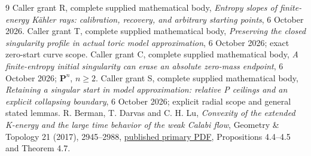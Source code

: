 \documentclass[11pt]{article}
\begin{document}
\begin{thebibliography}{9}
 Caller grant R, complete supplied mathematical body,
\emph{Entropy slopes of finite-energy K\"ahler rays: calibration,
recovery, and arbitrary starting points}, 6 October 2026.
 Caller grant T, complete supplied mathematical body,
\emph{Preserving the closed singularity profile in actual toric
model approximation}, 6 October 2026; exact zero-start curve scope.
 Caller grant C, complete supplied mathematical body,
\emph{A finite-entropy initial singularity can erase an absolute
zero-mass endpoint}, 6 October 2026; $\mathbf P^n$, $n\ge2$.
 Caller grant S, complete supplied mathematical body,
\emph{Retaining a singular start in model approximation:
relative P ceilings and an explicit collapsing boundary},
6 October 2026; explicit radial scope and general stated lemmas.
 R. Berman, T. Darvas and C. H. Lu,
\emph{Convexity of the extended K-energy and the large time behavior
of the weak Calabi flow}, Geometry \& Topology 21 (2017), 2945--2988,
\href{https://msp.org/gt/2017/21-5/gt-v21-n5-p08-s.pdf}{published primary PDF},
Propositions 4.4--4.5 and Theorem 4.7.
\end{thebibliography}
\end{document}
